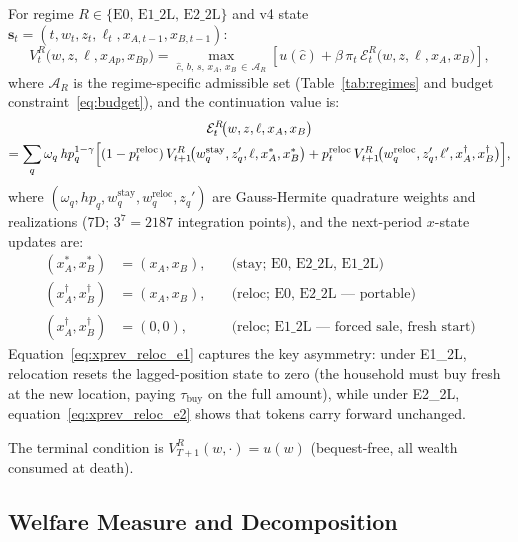 For regime $R \in \{\text{E0, E1\_2L, E2\_2L}\}$ and v4 state
$\mathbf{s}_t = (t, w_t, z_t, \ell_t, x_{A,t-1}, x_{B,t-1})$:
\begin{equation}
    V_t^R\!\bigl(w, z, \ell, x_{Ap}, x_{Bp}\bigr)
    = \max_{\hat{c},\, b,\, s,\, x_A,\, x_B \,\in\, \mathcal{A}_R}
    \left[
        u(\hat{c}) + \beta\,\pi_t\,
        \mathcal{E}_t^R\!\bigl(w, z, \ell, x_A, x_B\bigr)
    \right],
    \label{eq:bellman}
\end{equation}
where $\mathcal{A}_R$ is the regime-specific admissible set
(Table~\ref{tab:regimes} and budget constraint~\eqref{eq:budget}),
and the continuation value is:
\begin{multline}
    \mathcal{E}_t^R\!\bigl(w, z, \ell, x_A, x_B\bigr) \\
    = \sum_q \omega_q\,\mathit{hp}_q^{1-\gamma}
    \Bigl[
        (1 - p_t^{\text{reloc}})\,
        V_{t+1}^R\!\bigl(w_q^{\text{stay}},  z_q', \ell,  x_A^{\ast}, x_B^{\ast}\bigr)
        + p_t^{\text{reloc}}\,
        V_{t+1}^R\!\bigl(w_q^{\text{reloc}}, z_q', \ell', x_A^{\dagger}, x_B^{\dagger}\bigr)
    \Bigr],
    \label{eq:ev}
\end{multline}
where $(\omega_q, \mathit{hp}_q, w_q^{\text{stay}}, w_q^{\text{reloc}}, z_q')$
are Gauss-Hermite quadrature weights and realizations (7D; $3^7 = 2187$
integration points), and the next-period $x$-state updates are:
\begin{align}
    (x_A^{\ast}, x_B^{\ast})   &= (x_A, x_B),
        \quad &\text{(stay; E0, E2\_2L, E1\_2L)} \label{eq:xprev_stay} \\
    (x_A^{\dagger}, x_B^{\dagger}) &= (x_A, x_B),
        \quad &\text{(reloc; E0, E2\_2L — portable)} \label{eq:xprev_reloc_e2} \\
    (x_A^{\dagger}, x_B^{\dagger}) &= (0, 0),
        \quad &\text{(reloc; E1\_2L — forced sale, fresh start)}
        \label{eq:xprev_reloc_e1}
\end{align}
Equation~\eqref{eq:xprev_reloc_e1} captures the key asymmetry: under
E1\_2L, relocation resets the lagged-position state to zero (the household
must buy fresh at the new location, paying $\tau_{\text{buy}}$ on the full
amount), while under E2\_2L, equation~\eqref{eq:xprev_reloc_e2} shows that
tokens carry forward unchanged.

The terminal condition is $V_{T+1}^R(w, \cdot) = u(w)$
(bequest-free, all wealth consumed at death).

\subsection{Welfare Measure and Decomposition}
\label{sec:model:welfare}

